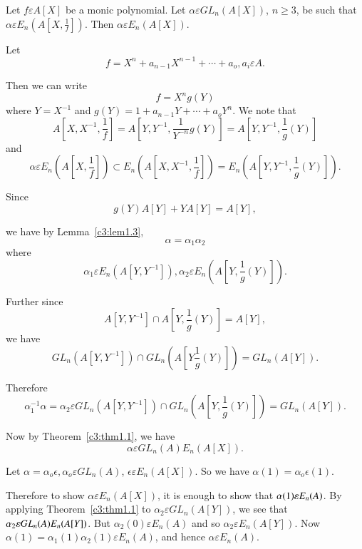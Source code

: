 \begin{coro}\label{c3:coro1.4}
Let $f\varepsilon A[X]$ be a monic polynomial. Let $\alpha \varepsilon
GL_n(A[X])$, $n\geq 3$, be such that $\alpha\varepsilon
E_n\left(A\left[X,\frac{1}{f}\right]\right)$. Then $\alpha\varepsilon E_n(A[X])$.
\end{coro}

\begin{Proof}
Let
$$
f=X^{n}+a_{n-1}X^{n-1}+\cdots+a_{o},a_i\varepsilon A.
$$

Then we can write
$$
f=X^{n}g(Y)
$$
where $Y=X^{-1}$ and $g(Y)=1+a_{n-1}Y+\cdots+a_oY^{n}$. We note that 
$$
A\left[X,X^{-1},\frac{1}{f}\right]=A\left[Y,Y^{-1},\frac{1}{Y^{-n}}g(Y)\right]=A\left[Y,Y^{-1},\frac{1}{g}(Y)\right]
$$
and 
$$
\alpha \varepsilon E_n\left(A\left[X,\frac{1}{f}\right]\right)\subset
E_n\left(A\left[X,X^{-1},\dfrac{1}{f}\right]\right)=E_n\left(A\left[Y,Y^{-1},\frac{1}{g}(Y)\right]\right).
$$

Since
$$
g(Y)A[Y]+YA[Y]=A[Y],
$$

we have by Lemma~\ref{c3:lem1.3},
$$
\alpha=\alpha_1\alpha_2
$$
where
$$
\alpha_1\varepsilon E_n\left(A\left[Y,Y^{-1}\right]\right),
\alpha_2\varepsilon E_n\left(A\left[Y,\frac{1}{g}(Y)\right]\right).
$$

Further since
$$
A[Y,Y^{-1}]\cap A\left[Y,\frac{1}{g}(Y)\right]=A[Y],
$$
we have
$$
GL_n\left(A\left[Y,Y^{-1}\right]\right)\cap GL_n\left(A\left[Y\frac{1}{g}(Y)\right]\right)=GL_n(A[Y]).
$$

Therefore
$$
\alpha^{-1}_1\alpha=\alpha_2\varepsilon
GL_n\left(A\left[Y,Y^{-1}\right]\right)\cap GL_n\left(A\left[Y,\frac{1}{g}(Y)\right]\right)=GL_n(A[Y]).
$$

Now by Theorem~\ref{c3:thm1.1}, we have 
$$
\alpha\varepsilon GL_n(A)E_n(A[X]).
$$

Let $\alpha=\alpha_{o}\epsilon, \alpha_o\varepsilon GL_n(A)$, $\epsilon\varepsilon
E_n(A[X])$. So we have $\alpha(1)=\alpha_o\epsilon(1)$. 

Therefore to show $\alpha \varepsilon E_n(A[X])$, it is enough to show
that $\alpha(1)\varepsilon\\ E_n(A)$. By applying
Theorem~\ref{c3:thm1.1} to $\alpha_2 \varepsilon GL_n(A[Y])$, we see
that $\alpha_2\varepsilon \\GL_n(A)E_n(A[Y])$. But $\alpha_2(0)
\varepsilon E_n(A)$ and so $\alpha_2 \varepsilon
E_n(A[Y])$. Now \\$\alpha(1)=\alpha_1(1)\alpha_2(1)\varepsilon
E_n(A)$, and hence $\alpha \varepsilon E_n(A)$.
\enprf
\end{Proof}

